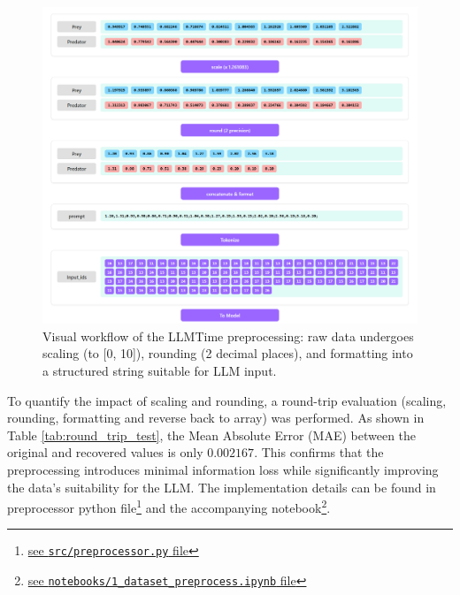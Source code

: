 \documentclass{article}
\begin{document}
\begin{figure}[!htbp]
    \centering
    \includegraphics[width=\linewidth]{M2 Course Work/Images/preprocess_vis.png}
    \caption{Visual workflow of the LLMTime preprocessing: raw data undergoes scaling (to [0, 10]), rounding (2 decimal places), and formatting into a structured string suitable for LLM input.}
    \label{fig:preprocessing_visual_workflow}
\end{figure}


To quantify the impact of scaling and rounding, a round-trip evaluation (scaling, rounding, formatting and reverse back to array) was performed. As shown in Table \ref{tab:round_trip_test}, the Mean Absolute Error (MAE) between the original and recovered values is only $0.002167$. This confirms that the preprocessing introduces minimal information loss while significantly improving the data's suitability for the LLM. The implementation details can be found in preprocessor python file\footnote{\href{https://gitlab.developers.cam.ac.uk/phy/data-intensive-science-mphil/assessments/m2_coursework/ym429/-/blob/main/src/preprocessor.py?ref_type=heads}{see \texttt{src/preprocessor.py} file}} and the accompanying notebook\footnote{\href{https://gitlab.developers.cam.ac.uk/phy/data-intensive-science-mphil/assessments/m2_coursework/ym429/-/blob/main/notebooks/1_dataset_preprocess.ipynb?ref_type=heads}{see \texttt{notebooks/1\_dataset\_preprocess.ipynb} file}}.
\end{document}
